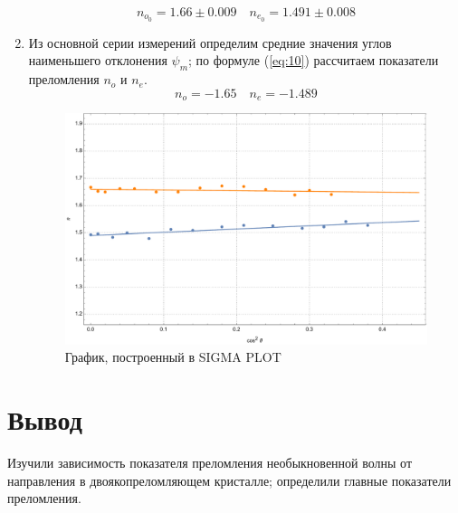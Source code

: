 \documentclass[a4paper, 12pt]{article}
\begin{document}
\begin{enumerate}
		 \begin{equation*}
		 	n_{o_0}=1.66\pm0.009\quad n_{e_0}=1.491\pm0.008
		 \end{equation*}
		 \item Из основной серии измерений определим средние значения углов наименьшего отклонения $\psi_m$; по формуле (\ref{eq:10}) рассчитаем показатели преломления $n_o$ и $n_e$.
		 \begin{equation*}
		 	n_o=-1.65 \quad n_e=-1.489
		 \end{equation*}
		 \newpage
		 \begin{figure}[h]
		 	\centering
		 	\includegraphics[scale=0.6]{Graphic.pdf}
		 	\caption{График, построенный в SIGMA PLOT}
		 	\label{fig:graphic}
		 \end{figure}
	\end{enumerate}
	\section{Вывод}
	Изучили зависимость показателя преломления необыкновенной волны от направления в двоякопреломляющем кристалле; определили главные показатели преломления.
\end{document}
